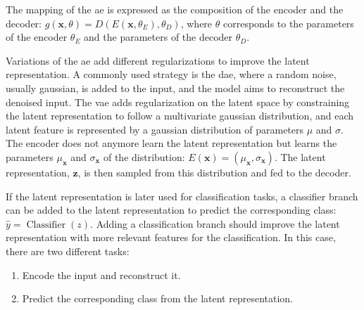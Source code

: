 \documentclass[../main.tex]{subfiles}
\begin{document}
	 The mapping of the \gls{ae} is expressed as the composition of the encoder and the decoder: \(g\left(\symbf{x}, \theta\right) = D\left(E\left(\symbf{x}, \theta_E\right), \theta_D\right)\), where \(\theta\) corresponds to the parameters of the encoder \(\theta_E\) and the parameters of the decoder \(\theta_D\).

	 Variations of the \gls{ae} add different regularizations to improve the latent representation.
	 A commonly used strategy is the \gls{dae}, where a random noise, usually gaussian, is added to the input, and the model aims to reconstruct the denoised input.
	 The \gls{vae} adds regularization on the latent space by constraining the latent representation to follow a multivariate gaussian distribution, and each latent feature is represented by a gaussian distribution of parameters \(\mu\) and \(\sigma\).
	 The encoder does not anymore learn the latent representation but learns the parameters \(\mu_{\symbf{x}}\) and \(\sigma_{\symbf{x}}\) of the distribution: \(E\left(\symbf{x}\right) = \left(\mu_{\symbf{x}},\sigma_{\symbf{x}}\right) \).
	 The latent representation, \(\symbf{z}\), is then sampled from this distribution and fed to the decoder.

	 If the latent representation is later used for classification tasks, a classifier branch can be added to the latent representation to predict the corresponding class: \(\hat{y} = \operatorname{Classifier}\left(z\right)\).
	 Adding a classification branch should improve the latent representation with more relevant features for the classification.
	 In this case, there are two different tasks:
	 \begin{enumerate}[nosep]
		 \item Encode the input and reconstruct it.
		 \item Predict the corresponding class from the latent representation.
	 \end{enumerate}

 \subsection{}
\end{document}
